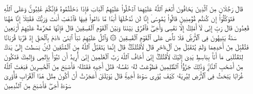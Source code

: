 \stopbuffer
\startbuffer[\q:5:23]
قَالَ رَجُلَانِ مِنَ ٱلَّذِینَ یَخَافُونَ أَنۡعَمَ ٱللَّهُ عَلَیۡهِمَا ٱدۡخُلُوا۟ عَلَیۡهِمُ ٱلۡبَابَ فَإِذَا دَخَلۡتُمُوهُ فَإِنَّكُمۡ غَٰلِبُونَۚ وَعَلَى ٱللَّهِ فَتَوَكَّلُوۤا۟ إِن كُنتُم مُّؤۡمِنِینَ%
\stopbuffer
\startbuffer[\q:5:24]
قَالُوا۟ یَٰمُوسَىٰۤ إِنَّا لَن نَّدۡخُلَهَاۤ أَبَدࣰا مَّا دَامُوا۟ فِیهَا فَٱذۡهَبۡ أَنتَ وَرَبُّكَ فَقَٰتِلَاۤ إِنَّا هَٰهُنَا قَٰعِدُونَ%
\stopbuffer
\startbuffer[\q:5:25]
قَالَ رَبِّ إِنِّی لَاۤ أَمۡلِكُ إِلَّا نَفۡسِی وَأَخِیۖ فَٱفۡرُقۡ بَیۡنَنَا وَبَیۡنَ ٱلۡقَوۡمِ ٱلۡفَٰسِقِینَ%
\stopbuffer
\startbuffer[\q:5:26]
قَالَ فَإِنَّهَا مُحَرَّمَةٌ عَلَیۡهِمۡۛ أَرۡبَعِینَ سَنَةࣰۛ یَتِیهُونَ فِی ٱلۡأَرۡضِۚ فَلَا تَأۡسَ عَلَى ٱلۡقَوۡمِ ٱلۡفَٰسِقِینَ%
\stopbuffer
\startbuffer[\q:5:27]
۞ وَٱتۡلُ عَلَیۡهِمۡ نَبَأَ ٱبۡنَیۡ ءَادَمَ بِٱلۡحَقِّ إِذۡ قَرَّبَا قُرۡبَانࣰا فَتُقُبِّلَ مِنۡ أَحَدِهِمَا وَلَمۡ یُتَقَبَّلۡ مِنَ ٱلۡءَاخَرِ قَالَ لَأَقۡتُلَنَّكَۖ قَالَ إِنَّمَا یَتَقَبَّلُ ٱللَّهُ مِنَ ٱلۡمُتَّقِینَ%
\stopbuffer
\startbuffer[\q:5:28]
لَئِنۢ بَسَطتَ إِلَیَّ یَدَكَ لِتَقۡتُلَنِی مَاۤ أَنَا۠ بِبَاسِطࣲ یَدِیَ إِلَیۡكَ لِأَقۡتُلَكَۖ إِنِّیۤ أَخَافُ ٱللَّهَ رَبَّ ٱلۡعَٰلَمِینَ%
\stopbuffer
\startbuffer[\q:5:29]
إِنِّیۤ أُرِیدُ أَن تَبُوۤأَ بِإِثۡمِی وَإِثۡمِكَ فَتَكُونَ مِنۡ أَصۡحَٰبِ ٱلنَّارِۚ وَذَٰلِكَ جَزَٰۤؤُا۟ ٱلظَّٰلِمِینَ%
\stopbuffer
\startbuffer[\q:5:30]
فَطَوَّعَتۡ لَهُۥ نَفۡسُهُۥ قَتۡلَ أَخِیهِ فَقَتَلَهُۥ فَأَصۡبَحَ مِنَ ٱلۡخَٰسِرِینَ%
\stopbuffer
\startbuffer[\q:5:31]
فَبَعَثَ ٱللَّهُ غُرَابࣰا یَبۡحَثُ فِی ٱلۡأَرۡضِ لِیُرِیَهُۥ كَیۡفَ یُوَٰرِی سَوۡءَةَ أَخِیهِۚ قَالَ یَٰوَیۡلَتَىٰۤ أَعَجَزۡتُ أَنۡ أَكُونَ مِثۡلَ هَٰذَا ٱلۡغُرَابِ فَأُوَٰرِیَ سَوۡءَةَ أَخِیۖ فَأَصۡبَحَ مِنَ ٱلنَّٰدِمِینَ%
\stopbuffer

